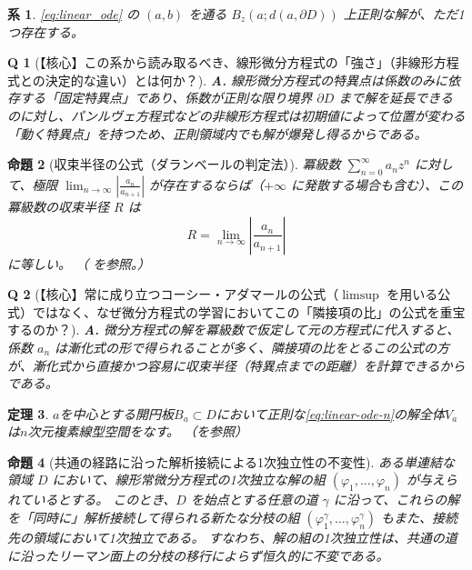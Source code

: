 \documentclass[paper=a4, fontsize=11pt]{jlreq} %
\theoremstyle{break}
\newtheorem{theorem}{定理}[section]
\newtheorem{proposition}[theorem]{命題}
\newtheorem{corollary}[theorem]{系}
\theoremstyle{qa}
\newtheorem*{Q}{Q}
\theoremstyle{remark} %
\begin{document}
\begin{corollary}\label{cor:linear_maximal_disk}
    \eqref{eq:linear_ode} の $(a,b)$ を通る $B_{z}(a;d(a,\partial D))$ 上正則な解が、ただ1つ存在する。
\end{corollary}

\begin{Q}[【核心】この系から読み取るべき、線形微分方程式の「強さ」（非線形方程式との決定的な違い）とは何か？]
\textbf{A.} 線形微分方程式の特異点は係数のみに依存する「固定特異点」であり、係数が正則な限り境界 $\partial D$ まで解を延長できるのに対し、パンルヴェ方程式などの非線形方程式は初期値によって位置が変わる「動く特異点」を持つため、正則領域内でも解が爆発し得るからである。
\end{Q}
\begin{proposition}[収束半径の公式（ダランベールの判定法）]\label{prop:dalembert_radius}
    冪級数 $\sum_{n=0}^{\infty}a_{n}z^{n}$ に対して、極限 $\lim_{n\to\infty}\left|\frac{a_{n}}{a_{n+1}}\right|$ が存在するならば（$+\infty$ に発散する場合も含む）、この冪級数の収束半径 $R$ は
    \begin{equation}
        R = \lim_{n\to\infty}\left|\frac{a_{n}}{a_{n+1}}\right|
    \end{equation}
    に等しい。
    （\cite[p.33 定理2.4.4]{book:noguchi} を参照。）
\end{proposition}

\begin{Q}[【核心】常に成り立つコーシー・アダマールの公式（$\limsup$ を用いる公式）ではなく、なぜ微分方程式の学習においてこの「隣接項の比」の公式を重宝するのか？]
\textbf{A.} 微分方程式の解を冪級数で仮定して元の方程式に代入すると、係数 $a_n$ は漸化式の形で得られることが多く、隣接項の比をとるこの公式の方が、漸化式から直接かつ容易に収束半径（特異点までの距離）を計算できるからである。
\end{Q}
\begin{theorem}\label{thm:solution_space_dimension}
    $a$を中心とする開円板$B_{a}\subset D$において正則な\eqref{eq:linear-ode-n}の解全体$V_{a}$は$n$次元複素線型空間をなす。
    （\cite[p.78 定理11.2]{book:takano}を参照）
\end{theorem}
\begin{proposition}[共通の経路に沿った解析接続による1次独立性の不変性]\label{prop:independence_branch_invariance}
    ある単連結な領域 $D$ において、線形常微分方程式の1次独立な解の組 $(\varphi_1, \dots, \varphi_n)$ が与えられているとする。
    このとき、$D$ を始点とする任意の道 $\gamma$ に沿って、これらの解を「同時に」解析接続して得られる新たな分枝の組 $(\varphi_1^\gamma, \dots, \varphi_n^\gamma)$ もまた、接続先の領域において1次独立である。
    すなわち、解の組の1次独立性は、共通の道に沿ったリーマン面上の分枝の移行によらず恒久的に不変である。
\end{proposition}
\end{document}

